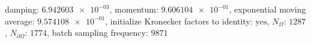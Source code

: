damping: $\num[scientific-notation=true]{6.942603e-03}$, momentum: $\num[scientific-notation=true]{9.606104e-01}$, exponential moving average: $\num[scientific-notation=true]{9.574108e-01}$, initialize Kronecker factors to identity: $\text{yes}$, $N_{\Omega}$: $\num[scientific-notation=false]{1287}$, $N_{\partial\Omega}$: $\num[scientific-notation=false]{1774}$, batch sampling frequency: $\num[scientific-notation=false]{9871}$